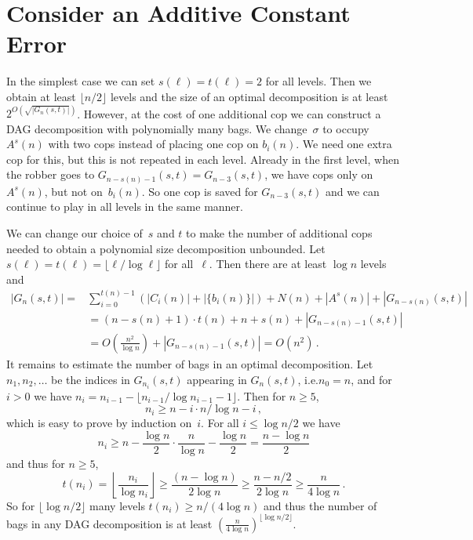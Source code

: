 \documentclass[authoryear]{article}
\makeatletter
\theoremstyle{definition}
\newcommand{\0}{\emptyset}
\newcommand{\ie}{i.e.\@\xspace}
\makeatother
\begin{document}
\section{Consider an Additive Constant Error}

In the simplest case we can set $s(\ell)= t(\ell) = 2$ for all
levels. Then we obtain at least $\lfloor n/2 \rfloor$ levels and the
size of an optimal decomposition is at least
$2^{O(\sqrt{|G_n(s,t)|})}$.  However, at the cost of one additional
cop we can construct a DAG decomposition with polynomially many
bags. We change~$\sigma$ to occupy $A^s(n)$ with two cops instead of
placing one cop on $b_i(n)$. We need one extra cop for this, but this
is not repeated in each level. Already in the first level, when the
robber goes to $G_{n-s(n)-1}(s,t) = G_{n-3}(s,t)$, we have cops only
on $A^s(n)$, but not
on~$b_i(n)$. So one cop is saved for $G_{n-3}(s,t)$ and we can
continue to play in all levels in the same manner.

We can change our choice of~$s$ and $t$ to make the number of
additional cops needed to obtain a polynomial size decomposition
unbounded. Let $s(\ell) = t(\ell) = \lfloor \ell/\log \ell\rfloor$ for
all~$\ell$. Then there are at least $\log n$ levels and
\begin{align*}
  |G_n(s,t)| = &\sum_{i=0}^{t(n)-1}(|C_i(n)| + |\{b_i(n)\}|) + N(n) +
                                                     |A^s(n)|  + |G_{n-s(n)}(s,t)|\\
                      & = (n -s(n) + 1)\cdot t(n) + n + s(n) +
                                                     |G_{n-s(n)-1}(s,t)|\\
                      & = O\left(\frac{n^2}{\log n}\right) + |G_{n-s(n)-1}(s,t)|
                                  = O(n^2)\,.
\end{align*}
It remains to estimate the number of bags in an optimal
decomposition. Let $n_1,n_2,\ldots$ be the indices in $G_{n_i}(s,t)$
appearing in $G_n(s,t)$, \ie $n_0 = n$, and for $i>0$ we have $n_i =
n_{i-1} - \lfloor n_{i-1}/\log n_{i-1} -1\rfloor$. Then for $n\ge 5$, \[n_i \ge n -
i\cdot n/\log n - i\,,\] which is easy to prove by induction
on~$i$. For all $i\le \log n/2$ we have 
\[n_i \ge n - \frac{\log n}{2}\cdot \frac{n}{\log n} -\frac{\log n}{2}
= \frac{n-\log n}{2} \] 
and thus for $n\ge 5$,
 \[t(n_i) =
\left\lfloor\frac{n_i}{\log n_i}\right\rfloor \ge \frac{(n-\log n)}{2\log n} \ge
\frac{n-n/2}{2\log n} \ge \frac{n}{4\log n}\,.\] So for $\lfloor\log
n/2\rfloor$ many levels $t(n_i) \ge n/(4\log n)$ and thus the number
of bags in any DAG decomposition is at least $(\frac{n}{4\log
  n})^{\lfloor\log n/2\rfloor}$.
\end{document}
